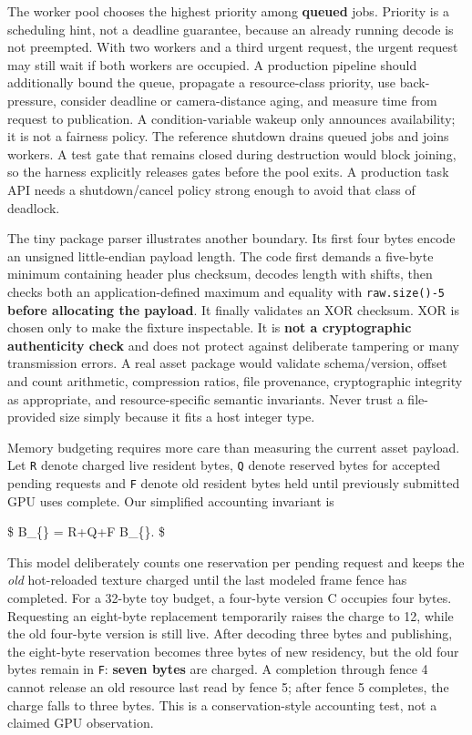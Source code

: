 The worker pool chooses the highest priority among \textbf{queued} jobs. Priority is a scheduling hint, not a deadline guarantee, because an already running decode is not preempted. With two workers and a third urgent request, the urgent request may still wait if both workers are occupied. A production pipeline should additionally bound the queue, propagate a resource-class priority, use back-pressure, consider deadline or camera-distance aging, and measure time from request to publication. A condition-variable wakeup only announces availability; it is not a fairness policy. The reference shutdown drains queued jobs and joins workers. A test gate that remains closed during destruction would block joining, so the harness explicitly releases gates before the pool exits. A production task API needs a shutdown/cancel policy strong enough to avoid that class of deadlock.

The tiny package parser illustrates another boundary. Its first four bytes encode an unsigned little-endian payload length. The code first demands a five-byte minimum containing header plus checksum, decodes length with shifts, then checks both an application-defined maximum and equality with \texttt{raw.size()-5} \textbf{before allocating the payload}. It finally validates an XOR checksum. XOR is chosen only to make the fixture inspectable. It is \textbf{not a cryptographic authenticity check} and does not protect against deliberate tampering or many transmission errors. A real asset package would validate schema/version, offset and count arithmetic, compression ratios, file provenance, cryptographic integrity as appropriate, and resource-specific semantic invariants. Never trust a file-provided size simply because it fits a host integer type.

Memory budgeting requires more care than measuring the current asset payload. Let \texttt{R} denote charged live resident bytes, \texttt{Q} denote reserved bytes for accepted pending requests and \texttt{F} denote old resident bytes held until previously submitted GPU uses complete. Our simplified accounting invariant is

\$ B\_\{\} = R+Q+F \le B\_\{\}. \$

This model deliberately counts one reservation per pending request and keeps the \emph{old} hot-reloaded texture charged until the last modeled frame fence has completed. For a 32-byte toy budget, a four-byte version C occupies four bytes. Requesting an eight-byte replacement temporarily raises the charge to 12, while the old four-byte version is still live. After decoding three bytes and publishing, the eight-byte reservation becomes three bytes of new residency, but the old four bytes remain in \texttt{F}: \textbf{seven bytes} are charged. A completion through fence 4 cannot release an old resource last read by fence 5; after fence 5 completes, the charge falls to three bytes. This is a conservation-style accounting test, not a claimed GPU observation.

